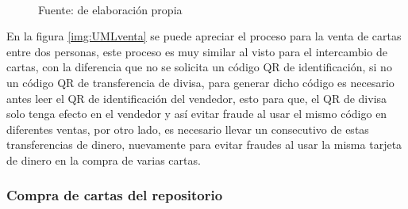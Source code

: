 \begin{figure}[!htb]
\begin{adjustbox}{width=12cm}
\end{adjustbox}
\\
{\footnotesize Fuente: de elaboración propia}
\end{figure}

En la figura \ref{img:UMLventa} se puede apreciar el proceso para la venta de cartas entre dos personas, este 
proceso es muy similar al visto para el intercambio de cartas, con la diferencia que no se solicita un código 
QR de identificación, si no un código QR de transferencia de divisa, para generar dicho código es necesario 
antes leer el QR de identificación del vendedor, esto para que, el QR de divisa solo tenga efecto en el 
vendedor y así evitar fraude al usar el mismo código en diferentes ventas, por otro lado, es necesario llevar 
un consecutivo de estas transferencias de dinero, nuevamente para evitar fraudes al usar la misma tarjeta de 
dinero en la compra de varias cartas.

\subsubsection{Compra de cartas del repositorio}

